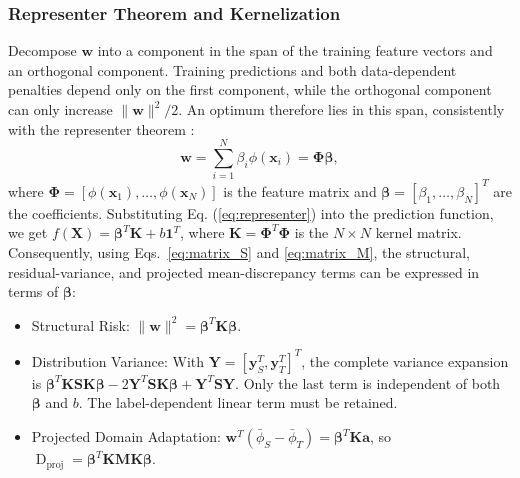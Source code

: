 \documentclass[a4paper]{cas-sc}
\begin{document}
\subsubsection{Representer Theorem and Kernelization}
{\color{blue}Decompose $\boldsymbol{w}$ into a component in the span of the training feature vectors and an orthogonal component. Training predictions and both data-dependent penalties depend only on the first component, while the orthogonal component can only increase $\|\boldsymbol{w}\|^2/2$. An optimum therefore lies in this span, consistently with the representer theorem \citep{scholkopf2001representer}:}
\begin{equation}
\label{eq:representer}
\boldsymbol{w} = \sum_{i=1}^{N} \beta_i \phi(\boldsymbol{x}_i) = \boldsymbol{\Phi} \boldsymbol{\beta},
\end{equation}
where $\boldsymbol{\Phi} = [\phi(\boldsymbol{x}_1), \dots, \phi(\boldsymbol{x}_N)]$ is the feature matrix and $\boldsymbol{\beta} = [\beta_1, \dots, \beta_N]^T$ are the coefficients.
Substituting Eq. (\ref{eq:representer}) into the prediction function, we get $f(\boldsymbol{X}) = \boldsymbol{\beta}^T \boldsymbol{K} + b \boldsymbol{1}^T$, where $\boldsymbol{K} = \boldsymbol{\Phi}^T \boldsymbol{\Phi}$ is the $N \times N$ kernel matrix.
{\color{blue}Consequently, using Eqs.~\eqref{eq:matrix_S} and \eqref{eq:matrix_M}, the structural, residual-variance, and projected mean-discrepancy terms can be expressed in terms of $\boldsymbol{\beta}$:}
\begin{itemize}
    \item Structural Risk: $\|\boldsymbol{w}\|^2 = \boldsymbol{\beta}^T \boldsymbol{K} \boldsymbol{\beta}$.
    \item {\color{blue}Distribution Variance: With $\boldsymbol{Y}=[\boldsymbol{y}_S^T,\boldsymbol{y}_T^T]^T$, the complete variance expansion is $\boldsymbol{\beta}^T\boldsymbol{K}\mathbf{S}\boldsymbol{K}\boldsymbol{\beta}-2\boldsymbol{Y}^T\mathbf{S}\boldsymbol{K}\boldsymbol{\beta}+\boldsymbol{Y}^T\mathbf{S}\boldsymbol{Y}$. Only the last term is independent of both $\boldsymbol{\beta}$ and $b$. The label-dependent linear term must be retained.}
    \item {\color{blue}Projected Domain Adaptation: $\boldsymbol{w}^T(\bar\phi_S-\bar\phi_T)=\boldsymbol{\beta}^T\boldsymbol{K}\boldsymbol{a}$, so $\operatorname{D}_{\mathrm{proj}}=\boldsymbol{\beta}^T\boldsymbol{K}\mathbf{M}\boldsymbol{K}\boldsymbol{\beta}$.}
\end{itemize}
\end{document}
